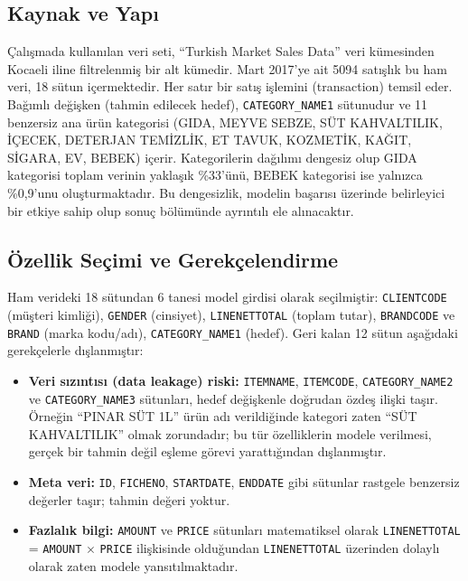 \documentclass[conference]{IEEEtran}
\begin{document}
\subsection{Kaynak ve Yapı}

Çalışmada kullanılan veri seti, ``Turkish Market Sales Data'' veri kümesinden Kocaeli iline filtrelenmiş bir alt kümedir. Mart 2017'ye ait 5094 satışlık bu ham veri, 18 sütun içermektedir. Her satır bir satış işlemini (transaction) temsil eder. Bağımlı değişken (tahmin edilecek hedef), \texttt{CATEGORY\_NAME1} sütunudur ve 11 benzersiz ana ürün kategorisi (GIDA, MEYVE SEBZE, SÜT KAHVALTILIK, İÇECEK, DETERJAN TEMİZLİK, ET TAVUK, KOZMETİK, KAĞIT, SİGARA, EV, BEBEK) içerir. Kategorilerin dağılımı dengesiz olup GIDA kategorisi toplam verinin yaklaşık \%33'ünü, BEBEK kategorisi ise yalnızca \%0,9'unu oluşturmaktadır. Bu dengesizlik, modelin başarısı üzerinde belirleyici bir etkiye sahip olup sonuç bölümünde ayrıntılı ele alınacaktır.

\subsection{Özellik Seçimi ve Gerekçelendirme}

Ham verideki 18 sütundan 6 tanesi model girdisi olarak seçilmiştir: \texttt{CLIENTCODE} (müşteri kimliği), \texttt{GENDER} (cinsiyet), \texttt{LINENETTOTAL} (toplam tutar), \texttt{BRANDCODE} ve \texttt{BRAND} (marka kodu/adı), \texttt{CATEGORY\_NAME1} (hedef). Geri kalan 12 sütun aşağıdaki gerekçelerle dışlanmıştır:

\begin{itemize}
    \item \textbf{Veri sızıntısı (data leakage) riski:} \texttt{ITEMNAME}, \texttt{ITEMCODE}, \texttt{CATEGORY\_NAME2} ve \texttt{CATEGORY\_NAME3} sütunları, hedef değişkenle doğrudan özdeş ilişki taşır. Örneğin ``PINAR SÜT 1L'' ürün adı verildiğinde kategori zaten ``SÜT KAHVALTILIK'' olmak zorundadır; bu tür özelliklerin modele verilmesi, gerçek bir tahmin değil eşleme görevi yarattığından dışlanmıştır.
    \item \textbf{Meta veri:} \texttt{ID}, \texttt{FICHENO}, \texttt{STARTDATE}, \texttt{ENDDATE} gibi sütunlar rastgele benzersiz değerler taşır; tahmin değeri yoktur.
    \item \textbf{Fazlalık bilgi:} \texttt{AMOUNT} ve \texttt{PRICE} sütunları matematiksel olarak \texttt{LINENETTOTAL} = \texttt{AMOUNT} $\times$ \texttt{PRICE} ilişkisinde olduğundan \texttt{LINENETTOTAL} üzerinden dolaylı olarak zaten modele yansıtılmaktadır.
\end{itemize}
\end{document}
